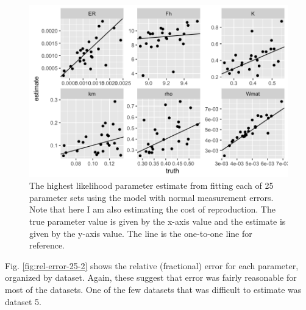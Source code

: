 \documentclass[12pt,reqno,final,pdftex]{amsart}\usepackage[]{graphicx}\usepackage[]{color}
\newenvironment{knitrout}{}{} %
\theoremstyle{plain}
\numberwithin{equation}{part}
\begin{document}
\begin{knitrout}\scriptsize
{}\color{fgcolor}\begin{figure}

\includegraphics[width=\linewidth]{figure/rep-cost-est-2-1} \hfill{}

\caption[The highest likelihood parameter estimate from fitting each of 25 parameter sets using the model with normal measurement errors]{The highest likelihood parameter estimate from fitting each of 25 parameter sets using the model with normal measurement errors. Note that here I am also estimating the cost of reproduction. The true parameter value is given by the x-axis value and the estimate is given by the y-axis value. The line is the one-to-one line for reference.}\label{fig:rep-cost-est-2}
\end{figure}


\end{knitrout}

Fig. \ref{fig:rel-error-25-2} shows the relative (fractional) error for each parameter, organized by dataset.
Again, these suggest that error was fairly reasonable for most of the datasets.
One of the few datasets that was difficult to estimate was dataset 5.
\end{document}
